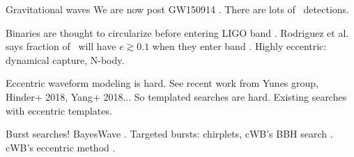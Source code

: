 
Gravitational waves
We are now post GW150914 \cite{GW150914}.
There are lots of \BBH~detections.
\par

Binaries are thought to circularize before entering LIGO band \CiteNeed.
Rodriguez et al. says fraction of \BBH~will have $e\gtrsim0.1$ when they enter band \CiteNeed.
Highly eccentric: dynamical capture, N-body.
\par

Eccentric waveform modeling is hard.
See recent work from Yunes group, Hinder+ 2018, Yang+ 2018... \CiteNeed
So templated searches are hard.
Existing searches with eccentric templates.
\par

Burst searches!
BayesWave \cite{cl2015}.
Targeted bursts: chirplets, cWB's BBH search \CiteNeed.
cWB's eccentric method \CiteNeed.
\par


